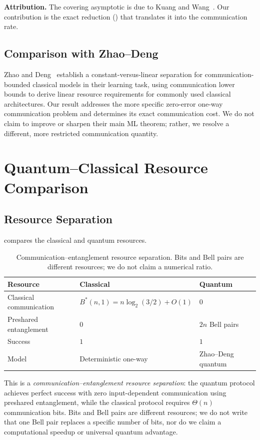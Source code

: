 \documentclass[11pt,letterpaper]{article}
\newcommand{\Bstar}{B^{\!*}}
\begin{document}
\textbf{Attribution.} The covering asymptotic is due to Kuang and Wang~\cite{kuangwang2026}. Our contribution is the exact reduction () that translates it into the communication rate.

\subsection{Comparison with Zhao--Deng}

Zhao and Deng~\cite{zhaodeng2025} establish a constant-versus-linear separation for communication-bounded classical models in their learning task, using communication lower bounds to derive linear resource requirements for commonly used classical architectures. Our result addresses the more specific zero-error one-way communication problem and determines its exact communication cost. We do not claim to improve or sharpen their main ML theorem; rather, we resolve a different, more restricted communication quantity.

\section{Quantum--Classical Resource Comparison}
\label{sec:quantum}

\subsection{Resource Separation}

 compares the classical and quantum resources.

\begin{table}[ht]
\centering
\caption{Communication--entanglement resource separation. Bits and Bell pairs are different resources; we do not claim a numerical ratio.}
\label{tab:resource}
\begin{tabular}{lll}
\toprule
Resource & Classical & Quantum \\
\midrule
Classical communication & $\Bstar(n,1) = n\log_2(3/2) + O(1)$ & $0$ \\
Preshared entanglement & $0$ & $2n$ Bell pairs \\
Success & $1$ & $1$ \\
Model & Deterministic one-way & Zhao--Deng quantum \\
\bottomrule
\end{tabular}
\end{table}

This is a \emph{communication--entanglement resource separation}: the quantum protocol achieves perfect success with zero input-dependent communication using preshared entanglement, while the classical protocol requires $\Theta(n)$ communication bits. Bits and Bell pairs are different resources; we do not write that one Bell pair replaces a specific number of bits, nor do we claim a computational speedup or universal quantum advantage.
\end{document}
